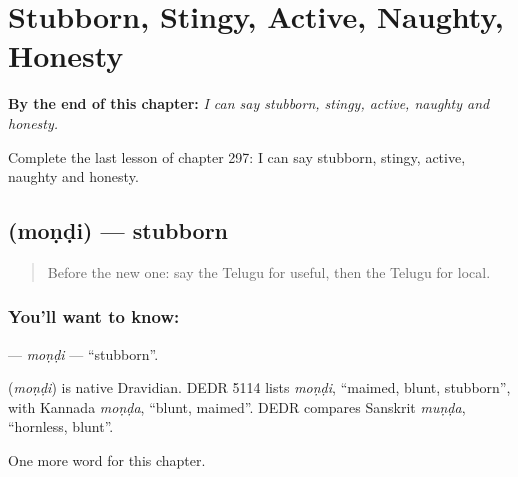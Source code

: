 
\chapter{Stubborn, Stingy, Active, Naughty, Honesty}
\label{ch:te-stubborn-stingy-active-naughty-honesty}

\begin{chapteropening}
\textbf{By the end of this chapter:} \emph{I can say stubborn, stingy, active, naughty and honesty.}

Complete the last lesson of chapter 297: I can say stubborn, stingy, active, naughty and honesty.
\end{chapteropening}

\section[\texorpdfstring{\te{మొండి} (moṇḍi)}{మొండి (moṇḍi)}]{ (moṇḍi) — stubborn}

\label{lesson:TE-C297-mondi}



\begin{quote}
Before the new one: say the Telugu for useful, then the Telugu for local.
\end{quote}

\subsection*{You'll want to know: }
\textbf{} — \emph{moṇḍi} — \textquotedblleft{}stubborn\textquotedblright{}.

\begin{cousinweb}
\textbf{} (\emph{moṇḍi}) is native Dravidian. DEDR 5114 lists \emph{moṇḍi}, \textquotedblleft{}maimed, blunt, stubborn\textquotedblright{}, with Kannada \emph{moṇḍa}, \textquotedblleft{}blunt, maimed\textquotedblright{}. DEDR compares Sanskrit \emph{muṇḍa}, \textquotedblleft{}hornless, blunt\textquotedblright{}.
\end{cousinweb}

\begin{grammarlens}[title={What you've built}]
One more word for this chapter.
\end{grammarlens}

